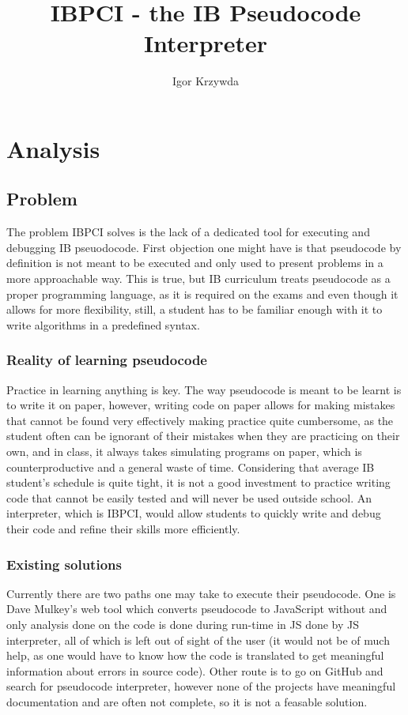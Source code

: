 \documentclass[12pt]{article}
\title{IBPCI - the IB Pseudocode Interpreter}
\author{Igor Krzywda}
\begin{document}
\maketitle

\section{Analysis}
\subsection{Problem}
The problem IBPCI solves is the lack of a dedicated tool for executing and debugging
IB pseuodocode. First objection one might have is that pseudocode by definition is
not meant to be executed and only used to present problems in a more approachable
way. This is true, but IB curriculum treats pseudocode as a proper programming language,
as it is required on the exams and even though it allows for more flexibility, still,
a student has to be familiar enough with it to write algorithms in a predefined syntax. 
\subsubsection*{Reality of learning pseudocode}
Practice in learning anything is key. The way pseudocode is meant to be learnt is to 
write it on paper, however, writing code on paper allows
for making mistakes that cannot be found very effectively making practice quite cumbersome,
as the student often can be ignorant of their mistakes when they are practicing on their 
own, and in class, it always takes simulating programs on paper, which is counterproductive
and a general waste of time. Considering that average IB student's schedule is quite
tight, it is not a good investment to practice writing code that cannot be easily tested
and will never be used outside school. An interpreter, which is IBPCI, would allow
students to quickly write and debug their code and refine their skills more efficiently.
\subsubsection*{Existing solutions}
Currently there are two paths one may take to execute their pseudocode. One is Dave 
Mulkey's web tool which converts pseudocode to JavaScript without and only analysis
done on the code is done during run-time in JS done by JS interpreter, all of which
is left out of sight of the user (it would not be of much help, as one would have to 
know how the code is translated to get meaningful information about errors in source 
code). Other route is to go on GitHub and search for pseudocode interpreter, however
none of the projects have meaningful documentation and are often not complete, so it
is not a feasable solution. 
\end{document}
